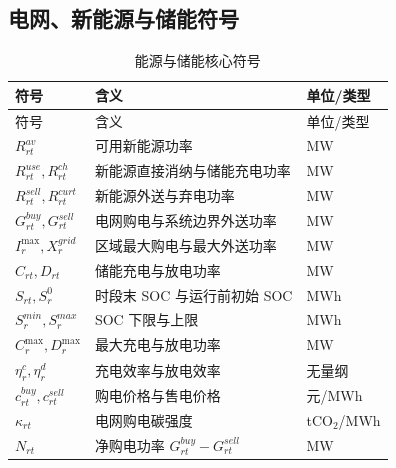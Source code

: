 \documentclass[withoutpreface,bwprint]{cumcmthesis}
\begin{document}
\subsection{电网、新能源与储能符号}
\begin{longtable}{p{}p{}p{}}
\caption{能源与储能核心符号}\label{tab:symbol-energy}\\
\toprule 符号 & 含义 & 单位/类型\\ \midrule\endfirsthead
\toprule 符号 & 含义 & 单位/类型\\ \midrule\endhead
\bottomrule\endfoot
$R_{rt}^{av}$ & 可用新能源功率 & MW\\
$R_{rt}^{use},R_{rt}^{ch}$ & 新能源直接消纳与储能充电功率 & MW\\
$R_{rt}^{sell},R_{rt}^{curt}$ & 新能源外送与弃电功率 & MW\\
$G_{rt}^{buy},G_{rt}^{sell}$ & 电网购电与系统边界外送功率 & MW\\
$I_r^{\max},X_r^{grid}$ & 区域最大购电与最大外送功率 & MW\\
$C_{rt},D_{rt}$ & 储能充电与放电功率 & MW\\
$S_{rt},S_r^0$ & 时段末 SOC 与运行前初始 SOC & MWh\\
$S_r^{min},S_r^{max}$ & SOC 下限与上限 & MWh\\
$C_r^{\max},D_r^{\max}$ & 最大充电与放电功率 & MW\\
$\eta_r^c,\eta_r^d$ & 充电效率与放电效率 & 无量纲\\
$c_{rt}^{buy},c_{rt}^{sell}$ & 购电价格与售电价格 & 元/MWh\\
$\kappa_{rt}$ & 电网购电碳强度 & tCO$_2$/MWh\\
$N_{rt}$ & 净购电功率 $G_{rt}^{buy}-G_{rt}^{sell}$ & MW\\
\end{longtable}
\end{document}
